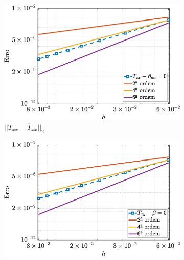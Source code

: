 \begin{figure}[H]
    \centering
    \caption{Erro para as componentes dos tensores de tensões, utilizando $Re=100$, $\beta_{nn} = 0$ e $Wi=1$ para o escoamento de fluido viscoelástico como o modelo UCM}
    \label{UCMerror2}
    \begin{subfigure}[b]{.47\textwidth}
        \includegraphics[width=\textwidth]{figures/Case12/UCM/Errors/NormErr_2nd_Re_100_Wi_1_epsilon_0_xi_0_alphaG_0_Dt_1e-06_at_0.05_tipsim_1_MMS_12_Txx.eps}
        \caption{$||T_{xx} - \overline{T}_{xx}||_{2}$}
        \label{error_txx_2nd_Case1_ucm}
    \end{subfigure}
    \vspace{0.2cm}
    \qquad
    \begin{subfigure}[b]{.47\textwidth}
        \includegraphics[width=\textwidth]{figures/Case12/UCM/Errors/NormErr_2nd_Re_100_Wi_1_epsilon_0_xi_0_alphaG_0_Dt_1e-06_at_0.05_tipsim_1_MMS_12_Txy.eps}

\end{subfigure}
\end{figure}
